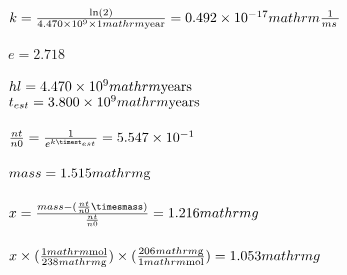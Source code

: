\documentclass{article}
\begin{document}
\\$k=\frac{\text{ln}(2)}{4.470\times10^{9}\times1\\mathrm{\mathrm{year}}}=0.492\times10^{-17}\\mathrm{\frac{1}{ms\,}}$\\
\\$e=2.718$\\
\\$hl=4.470\times10^{9}\\mathrm{\mathrm{years}}$\\
$t_{est}=3.800\times10^{9}\\mathrm{\mathrm{years}}$\\
\\$\frac{nt}{n0}=\frac{1}{e^{k\timest_{est}}}=5.547\times10^{-1}$\\
\\$mass=1.515\\mathrm{\mathrm{g}}$\\
\\$x=\frac{mass-(\frac{nt}{n0}\timesmass)}{\frac{nt}{n0}}=1.216\\mathrm{g\,}$\\
\\$x\times(\frac{1\\mathrm{\mathrm{mol}}}{238\\mathrm{\mathrm{g}}})\times(\frac{206\\mathrm{\mathrm{g}}}{1\\mathrm{\mathrm{mol}}})=1.053\\mathrm{g\,}$\\
\end{document}
